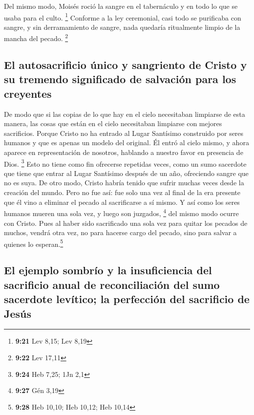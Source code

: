  Del mismo modo, Moisés roció la sangre en el tabernáculo
y en todo lo que se usaba para el culto. \footnote{\textbf{9:21} Lev
  8,15; Lev 8,19}  Conforme a la ley ceremonial, casi
todo se purificaba con sangre, y sin derramamiento de sangre, nada
quedaría ritualmente limpio de la mancha del pecado. \footnote{\textbf{9:22}
  Lev 17,11}

\hypertarget{el-autosacrificio-uxfanico-y-sangriento-de-cristo-y-su-tremendo-significado-de-salvaciuxf3n-para-los-creyentes}{%
\subsection{El autosacrificio único y sangriento de Cristo y su tremendo
significado de salvación para los
creyentes}\label{el-autosacrificio-uxfanico-y-sangriento-de-cristo-y-su-tremendo-significado-de-salvaciuxf3n-para-los-creyentes}}

 De modo que si las copias de lo que hay en el cielo
necesitaban limpiarse de esta manera, las cosas que están en el cielo
necesitaban limpiarse con mejores sacrificios.  Porque
Cristo no ha entrado al Lugar Santísimo construido por seres humanos y
que es apenas un modelo del original. Él entró al cielo mismo, y ahora
aparece en representación de nosotros, hablando a nuestro favor en
presencia de Dios. \footnote{\textbf{9:24} Heb 7,25; 1Jn 2,1}
 Esto no tiene como fin ofrecerse repetidas veces, como
un sumo sacerdote que tiene que entrar al Lugar Santísimo después de un
año, ofreciendo sangre que no es suya.  De otro modo,
Cristo habría tenido que sufrir muchas veces desde la creación del
mundo. Pero no fue así: fue solo una vez al final de la era presente que
él vino a eliminar el pecado al sacrificarse a sí mismo. 
Y así como los seres humanos mueren una sola vez, y luego son juzgados,
\footnote{\textbf{9:27} Gén 3,19}  del mismo modo ocurre
con Cristo. Pues al haber sido sacrificado una sola vez para quitar los
pecados de muchos, vendrá otra vez, no para hacerse cargo del pecado,
sino para salvar a quienes lo esperan.\footnote{\textbf{9:28} Heb 10,10;
  Heb 10,12; Heb 10,14}

\hypertarget{el-ejemplo-sombruxedo-y-la-insuficiencia-del-sacrificio-anual-de-reconciliaciuxf3n-del-sumo-sacerdote-levuxedtico-la-perfecciuxf3n-del-sacrificio-de-jesuxfas}{%
\subsection{El ejemplo sombrío y la insuficiencia del sacrificio anual
de reconciliación del sumo sacerdote levítico; la perfección del
sacrificio de
Jesús}\label{el-ejemplo-sombruxedo-y-la-insuficiencia-del-sacrificio-anual-de-reconciliaciuxf3n-del-sumo-sacerdote-levuxedtico-la-perfecciuxf3n-del-sacrificio-de-jesuxfas}}


